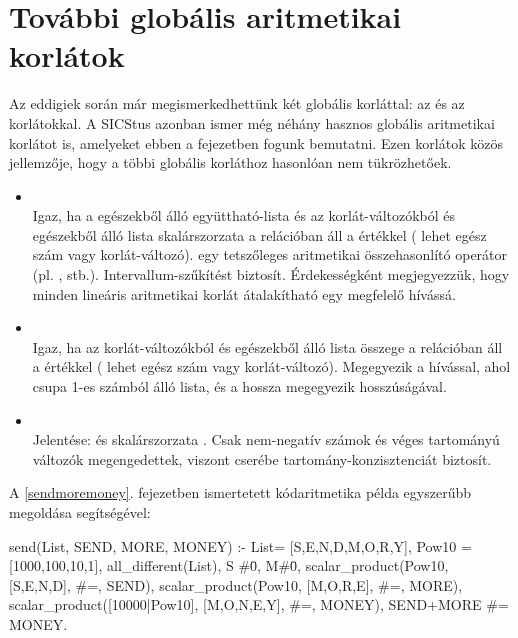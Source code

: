 \section{További globális aritmetikai korlátok}

Az eddigiek során már megismerkedhettünk két globális korláttal: az 
és az  korlátokkal. A SICStus azonban ismer még néhány hasznos
globális aritmetikai korlátot is, amelyeket ebben a fejezetben fogunk bemutatni. Ezen
korlátok közös jellemzője, hogy a többi globális korláthoz hasonlóan nem tükrözhetőek.

\begin{itemize}
\item {} \\
Igaz, ha a  egészekből álló együttható-lista és az  korlát-változókból
és egészekből álló lista skalárszorzata a  relációban áll a 
értékkel ( lehet egész szám vagy korlát-változó).  egy tetszőleges
aritmetikai összehasonlító operátor (pl. \cd{\#=}, \cd{\#<} stb.). Intervallum-szűkítést
biztosít. Érdekességként megjegyezzük, hogy minden lineáris aritmetikai korlát
átalakítható egy megfelelő  hívássá.

\item {} \\
Igaz, ha az  korlát-változókból és egészekből álló lista összege a 
relációban áll a  értékkel ( lehet egész szám vagy korlát-változó).
Megegyezik a  hívással, ahol 
csupa 1-es számból álló lista, és a hossza megegyezik  hosszúságával.

\item {} \\
Jelentése:  és  skalárszorzata . Csak nem-negatív
számok és véges tartományú változók megengedettek, viszont cserébe tartomány-konzisztenciát
biztosít.
\end{itemize}

A \ref{sendmoremoney}. fejezetben ismertetett kódaritmetika példa egyszerűbb megoldása
 segítségével:

\begin{prologcode}
send(List, SEND, MORE, MONEY) :-
        List= [S,E,N,D,M,O,R,Y],
        Pow10 = [1000,100,10,1],
        all_different(List), S #\= 0, M#\= 0,
        scalar_product(Pow10, [S,E,N,D], #=, SEND),
        scalar_product(Pow10, [M,O,R,E], #=, MORE),
        scalar_product([10000|Pow10], [M,O,N,E,Y],
                       #=, MONEY),
        SEND+MORE #= MONEY.
\end{prologcode}

